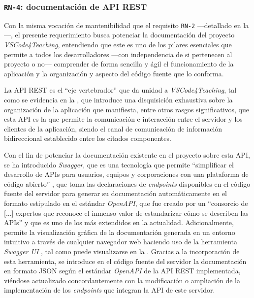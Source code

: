 \subsubsection{\texttt{RN-4}: documentación de API REST}
\label{subsec:rn4}

Con la misma vocación de mantenibilidad que el requisito \texttt{RN-2} ---detallado en la ---, el presente requerimiento busca potenciar la documentación del proyecto \textit{VSCode4Teaching}, entendiendo que este es uno de los pilares esenciales que permite a todos los desarrolladores ---con independencia de si pertenecen al proyecto o no--- comprender de forma sencilla y ágil el funcionamiento de la aplicación y la organización y aspecto del código fuente que lo conforma.

La API REST es el ``eje vertebrador'' que da unidad a \textit{VSCode4Teaching}, tal como se evidencia en la , que introduce una disquisición exhaustiva sobre la organización de la aplicación que manifiesta, entre otros rasgos significativos, que esta API es la que permite la comunicación e interacción entre el servidor y los clientes de la aplicación, siendo el canal de comunicación de información bidireccional establecido entre los citados componentes.

Con el fin de potenciar la documentación existente en el proyecto sobre esta API, se ha introducido \textit{Swagger}, que es una tecnología que permite ``simplificar el desarrollo de APIs para usuarios, equipos y corporaciones con una plataforma de código abierto'' \cite{rn4_swagger}, que toma las declaraciones de \textit{endpoints} disponibles en el código fuente del servidor para generar su documentación automáticamente en el formato estipulado en el estándar \textit{OpenAPI}, que fue creado por un ``consorcio de [...] expertos que reconoce el inmenso valor de estandarizar cómo se describen las APIs''\cite{rn4_openapi} y que es uno de los más extendidos en la actualidad. Adicionalmente, permite la visualización gráfica de la documentación generada en un entorno intuitivo a través de cualquier navegador web haciendo uso de la herramienta \textit{Swagger UI} \cite{rn4_swaggerui}, tal como puede visualizarse en la . Gracias a la incorporación de esta herramienta, se introduce en el código fuente del servidor la documentación en formato JSON según el estándar \textit{OpenAPI} de la API REST implementada, viéndose actualizado concordantemente con la modificación o ampliación de la implementación de los \textit{endpoints} que integran la API de este servidor.

